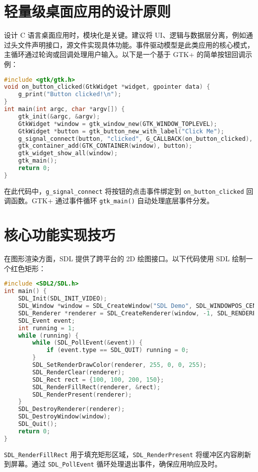 \chapter{轻量级桌面应用的设计原则}
设计 C 语言桌面应用时，模块化是关键。建议将 UI、逻辑与数据层分离，例如通过头文件声明接口，源文件实现具体功能。事件驱动模型是此类应用的核心模式，主循环通过轮询或回调处理用户输入。以下是一个基于 GTK+ 的简单按钮回调示例：\par
\begin{lstlisting}[language=c]
#include <gtk/gtk.h>
void on_button_clicked(GtkWidget *widget, gpointer data) {
    g_print("Button clicked!\n");
}
int main(int argc, char *argv[]) {
    gtk_init(&argc, &argv);
    GtkWidget *window = gtk_window_new(GTK_WINDOW_TOPLEVEL);
    GtkWidget *button = gtk_button_new_with_label("Click Me");
    g_signal_connect(button, "clicked", G_CALLBACK(on_button_clicked), NULL);
    gtk_container_add(GTK_CONTAINER(window), button);
    gtk_widget_show_all(window);
    gtk_main();
    return 0;
}
\end{lstlisting}
在此代码中，\verb!g_signal_connect! 将按钮的点击事件绑定到 \verb!on_button_clicked! 回调函数。GTK+ 通过事件循环 \verb!gtk_main()! 自动处理底层事件分发。\par
\chapter{核心功能实现技巧}
在图形渲染方面，SDL 提供了跨平台的 2D 绘图接口。以下代码使用 SDL 绘制一个红色矩形：\par
\begin{lstlisting}[language=c]
#include <SDL2/SDL.h>
int main() {
    SDL_Init(SDL_INIT_VIDEO);
    SDL_Window *window = SDL_CreateWindow("SDL Demo", SDL_WINDOWPOS_CENTERED, SDL_WINDOWPOS_CENTERED, 800, 600, 0);
    SDL_Renderer *renderer = SDL_CreateRenderer(window, -1, SDL_RENDERER_ACCELERATED);
    SDL_Event event;
    int running = 1;
    while (running) {
        while (SDL_PollEvent(&event)) {
            if (event.type == SDL_QUIT) running = 0;
        }
        SDL_SetRenderDrawColor(renderer, 255, 0, 0, 255);
        SDL_RenderClear(renderer);
        SDL_Rect rect = {100, 100, 200, 150};
        SDL_RenderFillRect(renderer, &rect);
        SDL_RenderPresent(renderer);
    }
    SDL_DestroyRenderer(renderer);
    SDL_DestroyWindow(window);
    SDL_Quit();
    return 0;
}
\end{lstlisting}
\verb!SDL_RenderFillRect! 用于填充矩形区域，\verb!SDL_RenderPresent! 将缓冲区内容刷新到屏幕。通过 \verb!SDL_PollEvent! 循环处理退出事件，确保应用响应及时。\par

